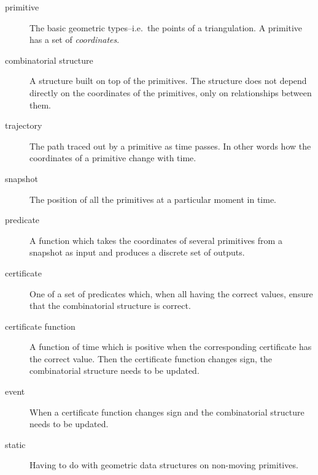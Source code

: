 \begin{description}
\item[primitive] The basic geometric types--i.e.\ the points of a
triangulation. A primitive has a set of {\em coordinates}.
\item[combinatorial structure] A structure built on top of the
primitives. The structure does not depend directly on the coordinates
of the primitives, only on relationships between them.
\item[trajectory] The path traced out by a primitive as time
passes. In other words how the coordinates of a primitive change with
time.
\item[snapshot] The position of all the primitives at a particular
moment in time.
\item[predicate] A function which takes the coordinates of several
primitives from a snapshot as input and produces a discrete set of
outputs.
\item[certificate] One of a set of predicates which, when all having
the correct values, ensure that the combinatorial structure is
correct.
\item[certificate function] A function of time which is positive when
the corresponding certificate has the correct value. Then the
certificate function changes sign, the combinatorial structure needs
to be updated.
\item[event] When a certificate function changes sign and the
combinatorial structure needs to be updated.
\item[static] Having to do with geometric data structures on non-moving primitives.
\end{description}












